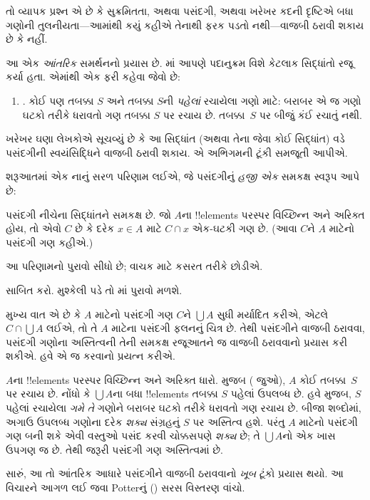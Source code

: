 \documentclass[../../../include/open-logic-section]{subfiles}
\begin{document}

તો વ્યાપક પ્રશ્ન એ છે કે સુક્રમિતતા,
અથવા પસંદગી, અથવા ખરેખર કદની દૃષ્ટિએ
બધા ગણોની તુલનીયતા---આમાંથી કયું
કહીએ તેનાથી ફરક પડતો નથી---વાજબી
ઠરાવી શકાય છે કે નહીં.

આ એક \emph{આંતરિક} સમર્થનનો પ્રયાસ છે.
માં આપણે પદાનુક્રમ
વિશે કેટલાક સિદ્ધાંતો રજૂ કર્યા હતા.
એમાંથી એક ફરી કહેવા જેવો છે:
\begin{enumerate}
	\item[] \stagesacc. કોઈ પણ તબક્કા $S$
	અને તબક્કા $S$ની \emph{પહેલાં} રચાયેલા
	ગણો માટે: બરાબર એ જ ગણો ઘટકો
	તરીકે ધરાવતો ગણ તબક્કા $S$ પર
	રચાય છે. તબક્કા~$S$ પર બીજું કંઈ
	રચાતું નથી.
\end{enumerate}
ખરેખર ઘણા લેખકોએ સૂચવ્યું છે કે
આ સિદ્ધાંત (અથવા તેના જેવા કોઈ
સિદ્ધાંત) વડે પસંદગીની સ્વયંસિદ્ધિને
વાજબી ઠરાવી શકાય. એ અભિગમની
ટૂંકી સમજૂતી આપીએ.

શરૂઆતમાં એક નાનું સરળ પરિણામ લઈએ,
જે પસંદગીનું \emph{હજી એક} સમકક્ષ
સ્વરૂપ આપે છે:

\begin{thm}[$\ZF$માં]
પસંદગી નીચેના સિદ્ધાંતને સમકક્ષ છે.
જો $A$ના !!{element}s પરસ્પર
વિચ્છિન્ન અને અરિક્ત હોય, તો એવો
$C$ છે કે દરેક $x \in A$ માટે
$C \cap x$ એક-ઘટકી ગણ છે.
(આવા $C$ને $A$ માટેનો
{પસંદગી ગણ} કહીએ.)
\end{thm}

આ પરિણામનો પુરાવો સીધો છે;
વાચક માટે કસરત તરીકે છોડીએ.

\begin{prob}
સાબિત કરો. મુશ્કેલી પડે તો
\cite[pp.~242--3]{Potter2004}માં
પુરાવો મળશે.
\end{prob}

મુખ્ય વાત એ છે કે $A$ માટેનો પસંદગી
ગણ $C$ને $\bigcup A$ સુધી મર્યાદિત કરીએ, એટલે
$C\cap\bigcup A$ લઈએ, તો તે $A$ માટેના પસંદગી ફલનનું
ચિત્ર છે. તેથી પસંદગીને વાજબી
ઠરાવવા, પસંદગી ગણોના અસ્તિત્વની
તેની સમકક્ષ રજૂઆતને જ વાજબી
ઠરાવવાનો પ્રયાસ કરી શકીએ.
હવે એ જ કરવાનો પ્રયત્ન કરીએ.

$A$ના !!{element}s પરસ્પર વિચ્છિન્ન
અને અરિક્ત ધારો. \stageshier{} મુજબ
( જુઓ), $A$
કોઈ તબક્કા~$S$ પર રચાય છે.
નોંધો કે $\bigcup A$ના બધા
!!{element}s તબક્કા $S$ પહેલાં
ઉપલબ્ધ છે. હવે \stagesacc{} મુજબ,
$S$ પહેલાં રચાયેલા \emph{ગમે તે}
ગણોને બરાબર ઘટકો તરીકે ધરાવતો
ગણ રચાય છે. બીજા શબ્દોમાં,
અગાઉ ઉપલબ્ધ ગણોના દરેક
\emph{શક્ય} સંગ્રહનું $S$ પર
અસ્તિત્વ હશે. પરંતુ $A$ માટેનો
પસંદગી ગણ બની શકે એવી વસ્તુઓ
પસંદ કરવી ચોક્કસપણે \emph{શક્ય}
છે; તે $\bigcup A$નો એક ખાસ
ઉપગણ જ છે. તેથી જરૂરી પસંદગી
ગણ અસ્તિત્વમાં છે.

સારું, આ તો આંતરિક આધારે પસંદગીને
વાજબી ઠરાવવાનો \emph{ખૂબ} ટૂંકો
પ્રયાસ થયો. આ વિચારને આગળ
લઈ જવા Potterનું
(\citeyear[\S14.8]{Potter2004})
સરસ વિસ્તરણ વાંચો.
\end{document}
